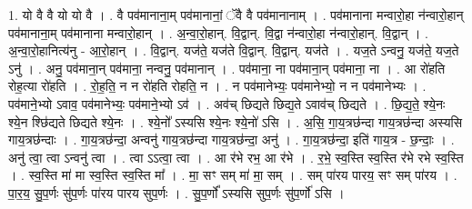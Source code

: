 \documentclass[17pt]{extarticle}
\begin{document}
1. यो वै वै यो यो वै । . वै पव॑मानाना॒म् पव॑मानानां॒ ॅवै वै पव॑मानानाम् । . पव॑मानाना मन्वारो॒हा न॑न्वारो॒हान् पव॑मानाना॒म् पव॑मानाना मन्वारो॒हान् । . अ॒न्वा॒रो॒हान्. वि॒द्वान्. वि॒द्वा न॑न्वारो॒हा न॑न्वारो॒हान्. वि॒द्वान् । . अ॒न्वा॒रो॒हानित्य॑नु - आ॒रो॒हान् । . वि॒द्वान्. यज॑ते॒ यज॑ते वि॒द्वान्. वि॒द्वान्. यज॑ते । . यज॒ते ऽन्वनु॒ यज॑ते॒ यज॒ते ऽनु॑ । . अनु॒ पव॑माना॒न् पव॑माना॒ नन्वनु॒ पव॑मानान् । . पव॑माना॒ ना पव॑माना॒न् पव॑माना॒ ना । . आ रो॑हति रोह॒त्या रो॑हति । . रो॒ह॒ति॒ न न रो॑हति रोहति॒ न । . न पव॑मानेभ्यः॒ पव॑मानेभ्यो॒ न न पव॑मानेभ्यः । . पव॑माने॒भ्यो ऽवाव॒ पव॑मानेभ्यः॒ पव॑माने॒भ्यो ऽव॑ । . अव॑च् छिद्यते छिद्य॒ते ऽवाव॑च् छिद्यते । . छि॒द्य॒ते॒ श्ये॒नः श्ये॒न श्छि॑द्यते छिद्यते श्ये॒नः । . श्ये॒नो᳚ ऽस्यसि श्ये॒नः श्ये॒नो॑ ऽसि । . अ॒सि॒ गा॒य॒त्रछ॑न्दा गाय॒त्रछ॑न्दा अस्यसि गाय॒त्रछ॑न्दाः । . गा॒य॒त्रछ॑न्दा॒ अन्वनु॑ गाय॒त्रछ॑न्दा गाय॒त्रछ॑न्दा॒ अनु॑ । . गा॒य॒त्रछ॑न्दा॒ इति॑ गाय॒त्र - छ॒न्दाः॒ । . अनु॑ त्वा॒ त्वा ऽन्वनु॑ त्वा । . त्वा ऽऽत्वा॒ त्वा । . आ र॑भे रभ॒ आ र॑भे । . र॒भे॒ स्व॒स्ति स्व॒स्ति र॑भे रभे स्व॒स्ति । . स्व॒स्ति मा॑ मा स्व॒स्ति स्व॒स्ति मा᳚ । . मा॒ सꣳ सम् मा॑ मा॒ सम् । . सम् पा॑रय पारय॒ सꣳ सम् पा॑रय । . पा॒र॒य॒ सु॒प॒र्णः सु॑प॒र्णः पा॑रय पारय सुप॒र्णः । . सु॒प॒र्णो᳚ ऽस्यसि सुप॒र्णः सु॑प॒र्णो॑ ऽसि । \newline
\end{document}
